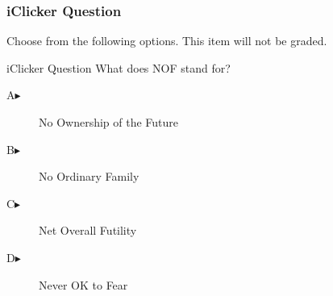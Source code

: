 \begin{frame}
  \frametitle{iClicker Question}
Choose from the following options. This item will not be graded.
\begin{block}{iClicker Question}
What does NOF stand for?
\end{block}
\begin{description}
\item[A\hspace{.2in}$\blacktriangleright$] No Ownership of the Future
\item[B\hspace{.2in}$\blacktriangleright$] No Ordinary Family
\item[C\hspace{.2in}$\blacktriangleright$] Net Overall Futility
\item[D\hspace{.2in}$\blacktriangleright$] Never OK to Fear
\end{description}
\end{frame}
